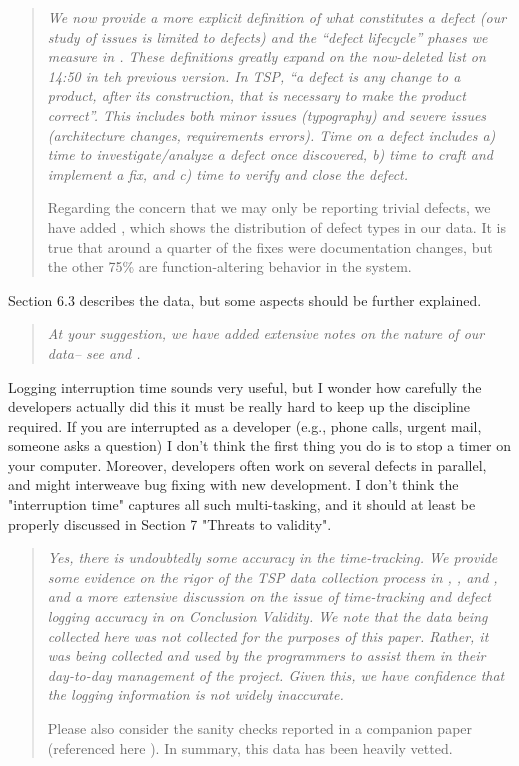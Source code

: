 \begin{quote} {\em
We now provide a more explicit definition of what constitutes a defect (our study of issues is limited to defects) and the ``defect lifecycle'' phases we measure in . These definitions greatly expand on the now-deleted list on 14:50 in teh previous version. In TSP, ``a defect is any change to a product, after its construction, that is necessary to make the product correct''. This includes both minor issues (typography) and severe issues (architecture changes, requirements errors). Time on a defect includes a) time to investigate/analyze a defect once discovered, b) time to craft and implement a fix, and c) time to verify and close the defect.

Regarding the concern that we may only be reporting trivial defects, we have added , which shows the distribution of defect types in our data. It is true that around a quarter of the fixes were documentation changes, but the other 75\% are function-altering behavior in the system. 
}\end{quote}


Section 6.3 describes the data, but some aspects
should be further explained.

\begin{quote} {\em
At your suggestion, we have added extensive notes on the nature of our data--
see  and .
}\end{quote}


Logging interruption time
sounds very useful, but I wonder how carefully the
developers actually did this 
 it must be really hard to keep up the discipline required.
 If you are interrupted as a developer (e.g., phone calls,
 urgent mail, someone asks a question) I don't think the
 first thing you do is to stop a timer on your computer.
 Moreover, developers often work on several defects in
 parallel, and might interweave bug fixing with new
 development. I don't think the "interruption time" captures
 all such multi-tasking, and it should at least be properly
 discussed in Section 7 "Threats to validity".

\begin{quote}{\em 
Yes, there is undoubtedly some accuracy in the time-tracking. We provide some evidence on the rigor of the TSP data collection process in , , and , and a more extensive discussion on the issue of time-tracking and defect logging accuracy in  on Conclusion Validity. We note that the data being collected here was not collected
for the purposes of this paper. Rather, it was being collected and used by the
programmers to assist them in their day-to-day management of the project.
Given this, we have confidence that the logging information is not widely inaccurate.

Please also consider the sanity checks reported in a companion paper (referenced here ). In summary, this data has been heavily vetted.
}
\end{quote}

